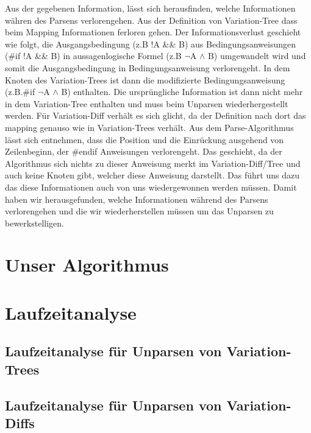 Aus der gegebenen Information, lässt sich herausfinden, welche Informationen währen des Parsens verlorengehen. Aus der Definition von Variation-Tree dass beim Mapping Informationen ferloren gehen. Der Informationsverlust geschieht wie folgt, die Ausgangsbedingung (z.B !A \&\& B) aus Bedingungsanweisungen (\#if !A \&\& B) in aussagenlogische Formel (z.B $\lnot$A $\land$ B) umgewandelt wird und somit die Ausgangsbedingung in Bedingungsanweisung verlorengeht. In dem Knoten des Variation-Trees ist dann die modifizierte Bedingungsanweisung (z.B.\#if $\lnot$A $\land$ B) enthalten. Die ursprüngliche Information ist dann nicht mehr in dem Variation-Tree enthalten und muss beim Unparsen wiederhergestellt werden. Für Variation-Diff verhält es sich glicht, da der Definition nach dort das mapping genauso wie in Variation-Trees verhält. Aus dem Parse-Algorithmus lässt sich entnehmen, dass die Position und die Einrückung ausgehend von Zeilenbeginn, der \#endif Anweisungen verlorengeht. Das geschieht, da der Algorithmus sich nichts zu dieser Anweisung merkt im Variation-Diff/Tree und auch keine Knoten gibt, welcher diese Anweisung darstellt. Das führt uns dazu das diese Informationen auch von uns wiedergewonnen werden müssen. Damit haben wir herausgefunden, welche Informationen während des Parsens verlorengehen und die wir wiederherstellen müssen um das Unparsen zu bewerkstelligen.






\section{Unser Algorithmus}



\section{Laufzeitanalyse}
\subsection{Laufzeitanalyse für Unparsen von Variation-Trees}

\subsection{Laufzeitanalyse für Unparsen von Variation-Diffs}

